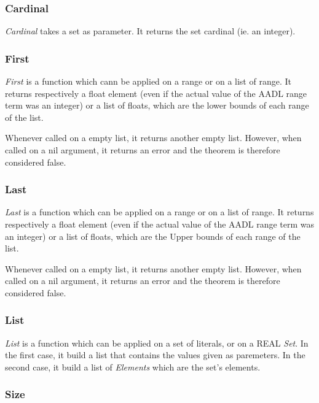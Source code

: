 \subsubsection {Cardinal}

\textit {Cardinal} takes a set as parameter. It returns the 
set cardinal (ie. an integer).

\subsubsection {First}

\textit{First} is a function which cann be applied on a range or on a 
list of range. It returns respectively a float element (even if the 
actual value of the AADL range term was an integer) or a list of
floats, which are the lower bounds of each range of the list.

Whenever called on a empty list, it returns another empty list. 
However, when called on a nil argument, it returns an error and
the theorem is therefore considered false.

\subsubsection {Last}

\textit{Last} is a function which can be applied on a range or on a 
list of range. It returns respectively a float element (even if the 
actual value of the AADL range term was an integer) or a list of
floats, which are the Upper bounds of each range of the list.

Whenever called on a empty list, it returns another empty list. 
However, when called on a nil argument, it returns an error and
the theorem is therefore considered false.

\subsubsection {List}

\textit{List} is a function which can be applied on a set of 
literals, or on a REAL \textit{Set}. In the first case, it
build a list that contains the values given as paremeters. In 
the second case, it build a list of \textit{Elements} which are 
the set's elements.

\subsubsection {Size}

